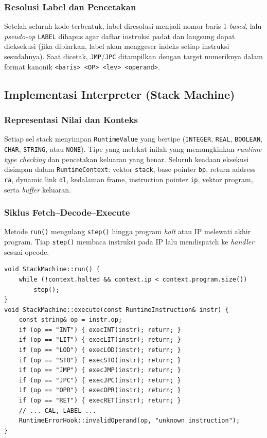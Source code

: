 \subsubsection{Resolusi Label dan Pencetakan}

Setelah seluruh kode terbentuk, label diresolusi menjadi nomor baris 1-\emph{based},
lalu \emph{pseudo-op} \texttt{LABEL} dihapus agar daftar instruksi padat dan langsung
dapat dieksekusi (jika dibiarkan, label akan menggeser indeks setiap instruksi
sesudahnya). Saat dicetak, \texttt{JMP}/\texttt{JPC} ditampilkan dengan target
numeriknya dalam format kanonik \texttt{<baris> <OP> <lev> <operand>}.

\subsection{Implementasi Interpreter (Stack Machine)}

\subsubsection{Representasi Nilai dan Konteks}

Setiap sel stack menyimpan \texttt{RuntimeValue} yang bertipe (\texttt{INTEGER},
\texttt{REAL}, \texttt{BOOLEAN}, \texttt{CHAR}, \texttt{STRING}, atau
\texttt{NONE}). Tipe yang melekat inilah yang memungkinkan \emph{runtime type
checking} dan pencetakan keluaran yang benar. Seluruh keadaan eksekusi disimpan
dalam \texttt{RuntimeContext}: vektor \texttt{stack}, base pointer \texttt{bp},
return address \texttt{ra}, dynamic link \texttt{dl}, kedalaman frame, instruction
pointer \texttt{ip}, vektor program, serta \emph{buffer} keluaran.

\subsubsection{Siklus Fetch--Decode--Execute}

Metode \texttt{run()} mengulang \texttt{step()} hingga program \emph{halt} atau IP
melewati akhir program. Tiap \texttt{step()} membaca instruksi pada IP lalu
mendispatch ke \emph{handler} sesuai opcode.

\begin{lstlisting}[style=kodeCpp, caption={Inti siklus eksekusi dan dispatch instruksi.}]
void StackMachine::run() {
    while (!context.halted && context.ip < context.program.size())
        step();
}
void StackMachine::execute(const RuntimeInstruction& instr) {
    const string& op = instr.op;
    if (op == "INT") { execINT(instr); return; }
    if (op == "LIT") { execLIT(instr); return; }
    if (op == "LOD") { execLOD(instr); return; }
    if (op == "STO") { execSTO(instr); return; }
    if (op == "JMP") { execJMP(instr); return; }
    if (op == "JPC") { execJPC(instr); return; }
    if (op == "OPR") { execOPR(instr); return; }
    if (op == "RET") { execRET(instr); return; }
    // ... CAL, LABEL ...
    RuntimeErrorHook::invalidOperand(op, "unknown instruction");
}
\end{lstlisting}

